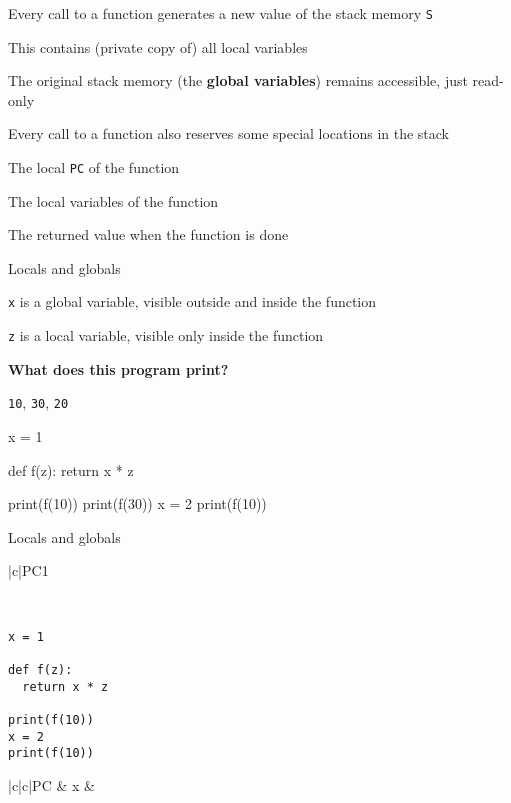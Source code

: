 \documentclass{beamer}
\begin{document}
\begin{slide}{
\item Every call to a function generates a new value of the stack memory \texttt{S}
\item This contains (private copy of) all local variables
\item The original stack memory (the \textbf{global variables}) remains accessible, just read-only 
}\end{slide}

\begin{slide}{
\item Every call to a function also reserves some special locations in the stack
\item The local \texttt{PC} of the function
\item The local variables of the function
\item The returned value when the function is done
}\end{slide}

\begin{frame}[fragile]{Locals and globals}
\begin{codewithblock}{\item \texttt{x} is a global variable, visible outside and inside the function \item \texttt{z} is a local variable, visible only inside the function \pause \item \textbf{What does this program print?} \pause \item \texttt{10}, \texttt{30}, \texttt{20}}
x = 1

def f(z):
  return x * z

print(f(10))
print(f(30))
x = 2
print(f(10))
\end{codewithblock}
\end{frame}

\begin{frame}[fragile]{Locals and globals}
\begin{statetable}
{|c|}{PC}{1}
\end{statetable} \ \\

\begin{lstlisting}
x = 1

def f(z):
  return x * z

print(f(10))
x = 2
print(f(10))
\end{lstlisting}

\pause

\begin{statetable}
{|c|c|}{PC & x}{ & }
\end{statetable} \ \\
\end{frame}
\end{document}
